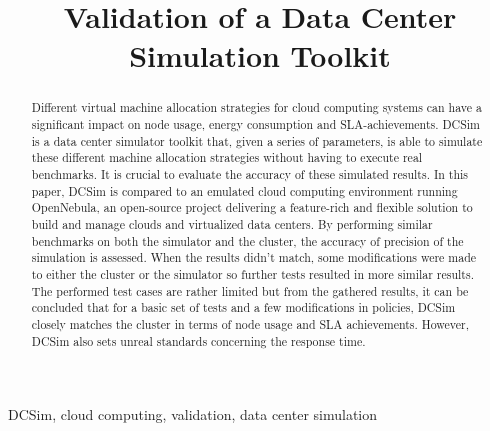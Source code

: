 \documentclass[conference, 10pt]{IEEEtran}
\begin{document}
%
\title{Validation of a Data Center Simulation Toolkit}


\author{
}

\maketitle

\begin{abstract}
Different virtual machine allocation strategies for cloud computing systems can have a significant impact on node usage, energy consumption and SLA-achievements. DCSim is a data center simulator toolkit that, given a series of parameters, is able to simulate these different machine allocation strategies without having to execute real benchmarks. It is crucial to evaluate the accuracy of these simulated results. In this paper, DCSim is compared to an emulated cloud computing environment running OpenNebula, an open-source project delivering a feature-rich and flexible solution to build and manage clouds and virtualized data centers. By performing similar benchmarks on both the simulator and the cluster, the accuracy of precision of the simulation is assessed. When the results didn't match, some modifications were made to either the cluster or the simulator so further tests resulted in more similar results. The performed test cases are rather limited but from the gathered results, it can be concluded that for a basic set of tests and a few modifications in policies, DCSim closely matches the cluster in terms of node usage and SLA achievements. However, DCSim also sets unreal standards concerning the response time.\\
\end{abstract}

\begin{IEEEkeywords}
DCSim, cloud computing, validation, data center simulation
\end{IEEEkeywords}
\end{document}
